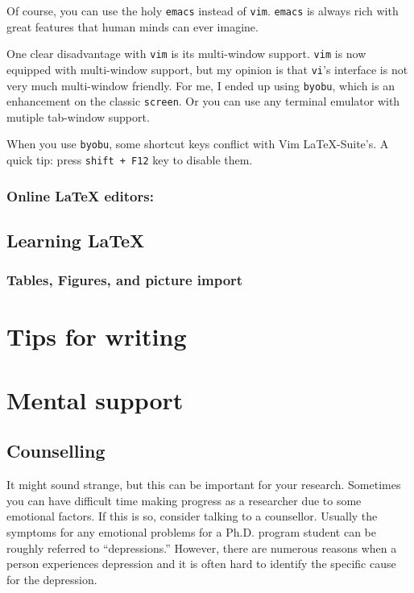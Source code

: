 \documentclass[11pt]{article}
\begin{document}
Of course, you can use the holy \texttt{emacs} instead of \texttt{vim}.
\texttt{emacs} is always rich with great features that human minds can
ever imagine. 

One clear disadvantage with \texttt{vim} is its multi-window support.
\texttt{vim} is now equipped with multi-window support, but my opinion is that
\texttt{vi}'s interface is not very much multi-window friendly. For me, I
ended up using \texttt{byobu}, which is an enhancement on the classic
\texttt{screen}. Or you can use any terminal emulator with mutiple tab-window
support.

When you use \texttt{byobu}, some shortcut keys conflict with Vim
LaTeX-Suite's. A quick tip: press \texttt{shift + F12} key to disable them.

\subsubsection{Online LaTeX editors:}


\subsection{Learning LaTeX}

\subsubsection{Tables, Figures, and picture import}


\section{Tips for writing}



\section{Mental support}

\subsection{Counselling}
It might sound strange, but this can be important for your research.
Sometimes you can have difficult time making progress as a researcher due to
some emotional factors. If this is so, consider talking to a counsellor.
Usually the symptoms for any emotional problems for a Ph.D.  program student
can be roughly referred to ``depressions.'' However, there are numerous
reasons when a person experiences depression and it is often hard to identify
the specific cause for the depression.
\end{document}
